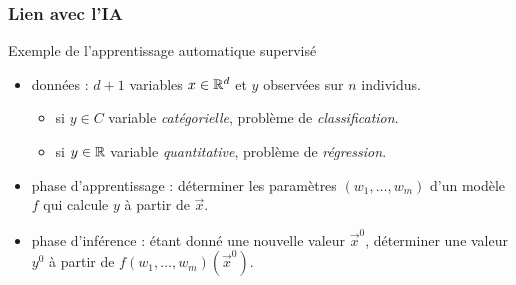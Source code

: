 \begin{frame}
  \frametitle{Lien avec l'IA}

  \begin{block}{Exemple de l'apprentissage automatique supervisé}

    \begin{itemize}
      \item données : $d+1$ variables ${x} \in {\ensuremath\mathbb{R}}^d$ et $y$ observées sur $n$ individus. 
        \begin{itemize}
        \item si $y \in C$ variable \emph{catégorielle}, problème de \emph{classification}. 
        \item si $y \in {\ensuremath\mathbb{R}}$ variable \emph{quantitative}, problème de \emph{régression}. 
        \end{itemize}
      \item phase d'apprentissage : déterminer les paramètres $(w_1, \dots, w_m)$ d'un modèle $f$
        qui calcule $y$ à partir de $\vec{x}$.
      \item phase d'inférence : étant donné une nouvelle valeur $\vec{x}^0$,
        déterminer une valeur $y^0$ à partir de $f(w_1, \dots, w_m)(\vec{x}^0)$. 
    \end{itemize}
  \end{block}

\end{frame}






